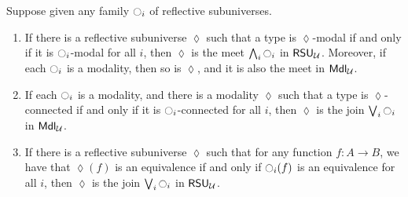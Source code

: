 \begin{thm}\label{thm:meet-join}
  Suppose given any family ${\ocircle}_i$ of reflective subuniverses.
  \begin{enumerate}
  \item If there is a reflective subuniverse $\lozenge$ such that a type is $\lozenge$-modal if and only if it is ${\ocircle}_i$-modal for all $i$, then $\lozenge$ is the meet $\bigwedge_i {\ocircle}_i$ in $\mathsf{RSU}_{\mathcal{U}}$.
    Moreover, if each ${\ocircle}_i$ is a modality, then so is $\lozenge$, and it is also the meet in $\mathsf{Mdl}_{\mathcal{U}}$.\label{item:mj1}
  \item If each ${\ocircle}_i$ is a modality, and there is a modality $\lozenge$ such that a type is $\lozenge$-connected if and only if it is ${\ocircle}_i$-connected for all $i$, then $\lozenge$ is the join $\bigvee_i {\ocircle}_i$ in $\mathsf{Mdl}_{\mathcal{U}}$.\label{item:mj2}
  \item If there is a reflective subuniverse $\lozenge$ such that for any function $f:A\to B$, we have that $\lozenge(f)$ is an equivalence if and only if ${\ocircle}_i(f)$ is an equivalence for all $i$, then $\lozenge$ is the join $\bigvee_i {\ocircle}_i$ in $\mathsf{RSU}_{\mathcal{U}}$.\label{item:mj3}
  \end{enumerate}
\end{thm}
